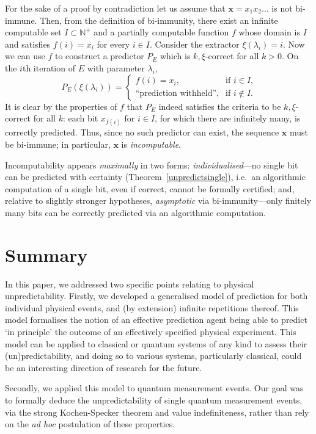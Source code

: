 \documentclass[%
 superscriptaddress,
 preprint,
 showpacs,
 showkeys,
 preprintnumbers,
 nofootinbib,
  amsmath,amssymb,
  aps,
 pra,
  longbibliography,
  floatfix,
 ]{revtex4-1}
\theoremstyle{definition}
\newcommand{\N}{\mathbb{N}}%
\newcommand{\x}{\mathbf{x}}
\begin{document}
For the sake of a proof by contradiction let us assume that $\x=x_1x_2\dots$ is not bi-immune. 
Then, from the definition of bi-immunity, there exist an infinite computable set $I \subset \N^+$ and a partially computable function $f$ whose domain is $I$ and satisfies $f(i)=x_i$ for every $i\in I$.
Consider the extractor $\xi(\lambda_i) = i$.
Now we can use $f$ to construct a predictor $P_E$ which is $k,\xi$-correct for all $k>0$. 
On the $i$th iteration of $E$ with parameter $\lambda_i$, $$P_E(\xi(\lambda_i))=\begin{cases}f(i)=x_i, & \text{if $i\in I$,}\\\text{``{prediction withheld}'',} & \text{if $i\notin I$.}\end{cases}$$
It is clear by the properties of $f$ that $P_E$ indeed satisfies the criteria to be $k,\xi$-correct for all $k$:
each bit $x_{f(i)}$ for $i\in I$, for which there are infinitely many, is correctly predicted.
Thus, since no such predictor can exist, the sequence $\x$ must be bi-immune; in particular,   $\x$ is \emph{incomputable}.

\fi

Incomputability appears \emph{maximally} in two forms: \emph{individualised}---no single bit can be predicted with certainty (Theorem~\ref{unpredictsingle}), i.e.\  an algorithmic computation
of a single bit, even if correct, cannot be formally certified; and, relative to slightly stronger hypotheses, \emph{asymptotic} via  bi-immunity---only finitely many bits can be correctly predicted via an algorithmic computation.
\fi

 
\section{Summary}

In this paper, we addressed two specific points relating to physical unpredictability.
Firstly, we developed a generalised model of prediction for both individual physical events, and (by extension) infinite repetitions thereof.
This model formalises the notion of an effective prediction agent being able to predict `in principle' the outcome of an effectively specified physical experiment.
This model can be applied to classical or quantum systems of any kind to assess their (un)predictability, and doing so to various systems, particularly classical, could be an interesting direction of research for the future.

Secondly, we  applied this model to quantum measurement events.
Our goal was to formally deduce the unpredictability of single quantum measurement events, via the strong Kochen-Specker theorem and value indefiniteness, rather than rely on the \emph{ad hoc} postulation of these properties.
\end{document}
